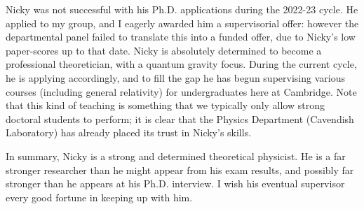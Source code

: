 Nicky was not successful with his Ph.D. applications during the 2022-23 cycle. He applied to my group, and I eagerly awarded him a supervisorial offer: however the departmental panel failed to translate this into a funded offer, due to Nicky's low paper-scores up to that date. Nicky is absolutely determined to become a professional theoretician, with a quantum gravity focus. During the current cycle, he is applying accordingly, and to fill the gap he has begun supervising various courses (including general relativity) for undergraduates here at Cambridge. Note that this kind of teaching is something that we typically only allow strong doctoral students to perform; it is clear that the Physics Department (Cavendish Laboratory) has already placed its trust in Nicky's skills.

In summary, Nicky is a strong and determined theoretical physicist. He is a far stronger researcher than he might appear from his exam results, and possibly far stronger than he appears at his Ph.D. interview. I wish his eventual supervisor every good fortune in keeping up with him.
